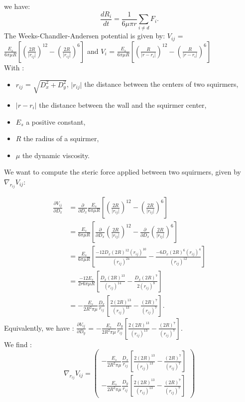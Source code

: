 \documentclass{article}
\begin{document}
we have:
$$\frac{dR_i}{dt} = \frac{1}{6\mu\pi r}\sum\limits_{i \ne d} F_i.$$
The Weeks-Chandler-Andersen potential is given by:
$V_{ij}$ = $\frac{E_s}{6\pi\mu R}\left[\left(\frac{2R}{\lvert r_{ij}\rvert}\right)^{12} - \left(\frac{2R}{\lvert r_{ij}\rvert}\right)^6\right]$ and  $V_i$ = $\frac{E_s}{6\pi\mu R} \left[ \left( \frac{R}{\lvert r - r_i \rvert} \right)^{12} - \left( \frac{R}{\lvert r - r_i \rvert} \right) ^6 \right]$ 
\vspace{0,3cm}
\\With : \begin{itemize}
    \item $r_{ij}$ = $\sqrt{D_x^2+D_y^2}$, $\lvert r_{ij} \rvert$ the distance between the centers of two squirmers,
    \item $\lvert r - r_i\rvert$ the distance between the wall and the squirmer center,
    \item $E_s$ a positive constant,
    \item $R$ the radius of a squirmer,
    \item $\mu$ the dynamic viscosity.
\end{itemize}

\vspace{0,5cm}
We want to compute the steric force applied between two squirmers, given by $\nabla_{r_{ij}} V_{ij}$:

\begin{align*}
\frac{\partial V_{ij}}{\partial D_x} &= \frac{\partial}{\partial D_x}\frac{E_s}{6\pi\mu R}\left[\left(\frac{2R}{\lvert r_{ij}\rvert}\right)^{12} - \left(\frac{2R}{\lvert r_{ij}\rvert}\right)^6\right] \\
&= \frac{E_s}{6\pi\mu R} \left[\frac{\partial}{\partial D_x}\left(\frac{2R}{\lvert r_{ij}\rvert}\right)^{12} - \frac{\partial}{\partial D_x} \left(\frac{2R}{\lvert r_{ij}\rvert}\right)^6\right] \\
&= \frac{E_s}{6\pi\mu R} \left[ \frac{-12 D_x (2R)^{12}(r_{ij})^{10}}{(r_{ij})^{24}} - \frac{-6D_x(2R)^6(r_{ij})^4}{(r_{ij})^{12}}  \right] \\
&= \frac{-12 E_s}{2r6\pi\mu R} \left[ \frac{D_x (2R)^{13}}{(r_{ij})^{14}} - \frac{D_x (2R)^{7}}{2(r_{ij})^8}\right] \\
&= -\frac{E_s}{2R^2\pi\mu} \frac{D_x}{r_{ij}} \left[ \frac{2(2R)^{13}}{(r_{ij})^{13}} - \frac{(2R)^7}{(r_{ij})^{7}}\right].
\end{align*}
Equivalently, we have : 
$\frac{\partial V_{ij}}{\partial D_y}$ = $-\frac{E_s}{2R^2\pi\mu} \frac{D_y}{r_{ij}}\left[ \frac{2(2R)^{13}}{(r_{ij})^{13}} - \frac{(2R)^7}{(r_{ij})^7} \right].$
\\ We find : 
\begin{equation*}
    \boxed{\nabla_{r_{ij}} V_{ij} = 
    \begin{pmatrix}
        -\frac{E_s}{2R^2\pi\mu} \frac{D_x}{r_{ij}}\left[ \frac{2(2R)^{13}}{(r_{ij})^{13}} - \frac{(2R)^7}{(r_{ij})^7} \right] \\
        -\frac{E_s}{2R^2\pi\mu} \frac{D_y}{r_{ij}}\left[ \frac{2(2R)^{13}}{(r_{ij})^{13}} - \frac{(2R)^7}{(r_{ij})^7} \right]
    \end{pmatrix}}
\end{equation*}
\end{document}

